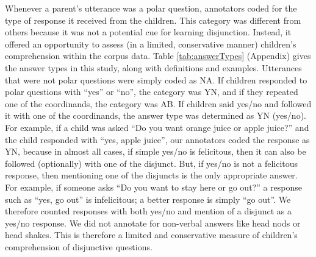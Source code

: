 \documentclass[
  ,man,floatsintext]{apa6}
\begin{document}
Whenever a parent's utterance was a polar question, annotators coded for the type of response it received from the children. This category was different from others because it was not a potential cue for learning disjunction. Instead, it offered an opportunity to assess (in a limited, conservative manner) children's comprehension within the corpus data. Table \ref{tab:answerTypes} (Appendix) gives the answer types in this study, along with definitions and examples. Utterances that were not polar questions were simply coded as NA. If children responded to polar questions with ``yes'' or ``no'', the category was YN, and if they repeated one of the coordinands, the category was AB. If children said yes/no and followed it with one of the coordinands, the answer type was determined as YN (yes/no). For example, if a child was asked ``Do you want orange juice or apple juice?'' and the child responded with ``yes, apple juice'', our annotators coded the response as YN, because in almost all cases, if simple yes/no is felicitous, then it can also be followed (optionally) with one of the disjunct. But, if yes/no is not a felicitous response, then mentioning one of the disjuncts is the only appropriate answer. For example, if someone asks ``Do you want to stay here or go out?'' a response such as ``yes, go out'' is infelicitous; a better response is simply ``go out''. We therefore counted responses with both yes/no and mention of a disjunct as a yes/no response. We did not annotate for non-verbal answers like head nods or head shakes. This is therefore a limited and conservative measure of children's comprehension of disjunctive questions.
\end{document}
